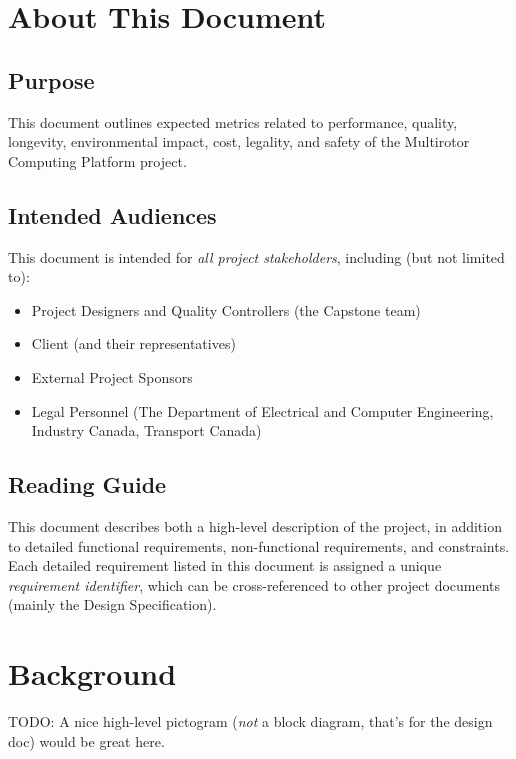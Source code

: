 \documentclass[10pt,letterpaper]{article}
\begin{document}


\section{About This Document}\label{section:about}
\subsection{Purpose}\label{section:about:purpose}
This document outlines expected metrics related to performance, quality, longevity, environmental impact, cost, legality, and safety of the Multirotor Computing Platform project.

\subsection{Intended Audiences}\label{section:about:audience}
This document is intended for \textit{all project stakeholders}, including (but not limited to):
\begin{itemize}
\item Project Designers and Quality Controllers (the Capstone team)
\item Client (and their representatives)
\item External Project Sponsors
\item Legal Personnel (The Department of Electrical and Computer Engineering, Industry Canada, Transport Canada)
\end{itemize}

\subsection{Reading Guide}\label{section:about:readingguide}
This document describes both a high-level description of the project, in addition to detailed functional requirements, non-functional requirements, and constraints. Each detailed requirement listed in this document is assigned a unique \textit{requirement identifier}, which can be cross-referenced to other project documents (mainly the Design Specification). 

\section{Background}

% 
% 

TODO: A nice high-level pictogram (\textit{not} a block diagram, that's for the design doc) would be great here.
\end{document}

